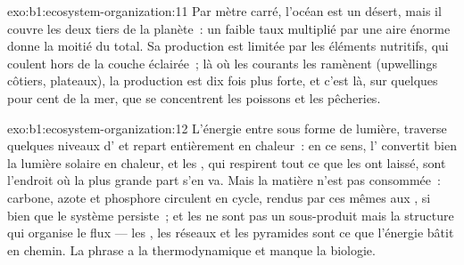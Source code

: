 \begin{solution}{exo:b1:ecosystem-organization:11}
Par mètre carré, l'océan est un désert, mais il couvre les deux tiers
de la planète~: un faible taux multiplié par une aire énorme donne la
moitié du total. Sa production est limitée par les éléments nutritifs,
qui coulent hors de la couche éclairée~; là où les courants les
ramènent (upwellings côtiers, plateaux), la production est dix fois plus
forte, et c'est là, sur quelques pour cent de la mer, que se
concentrent les poissons et les pêcheries.
\end{solution}

\begin{solution}{exo:b1:ecosystem-organization:12}
L'énergie entre sous forme de lumière, traverse quelques niveaux
d' et repart entièrement en chaleur~: en ce sens,
l' convertit bien la lumière solaire en chaleur, et les
, qui respirent tout ce que les  ont laissé,
sont l'endroit où la plus grande part s'en va. Mais la matière n'est
pas consommée~: carbone, azote et phosphore circulent en cycle, rendus
par ces mêmes  aux , si bien que le système
persiste~; et les  ne sont pas un sous-produit mais la
structure qui organise le flux --- les , les réseaux et les
pyramides sont ce que l'énergie bâtit en chemin. La phrase a la
thermodynamique et manque la biologie.
\end{solution}

